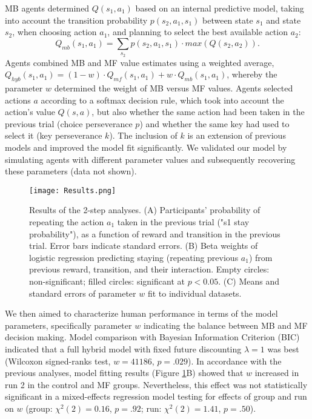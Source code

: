 \documentclass[11pt]{article} %
\begin{document}
MB agents determined $Q(s_{1}, a_{1})$ based on an internal predictive model, taking into account the transition probability $p(s_{2}, a_{1}, s_{1})$ between state $s_{1}$ and state $s_{2}$, when choosing action $a_{1}$, and planning to select the best available action $a_{2}$:
%
\begin{equation}
Q_{mb}(s_{1}, a_{1}) = \sum_{s_{2}} p(s_{2}, a_{1}, s_{1}) \cdot max(Q(s_{2}, a_{2})).
\end{equation}
%
Agents combined MB and MF value estimates using a weighted average, $Q_{hyb}(s_{1}, a_{1}) = (1 - w) \cdot Q_{mf}(s_{1}, a_{1}) + w \cdot Q_{mb}(s_{1}, a_{1})$, whereby the parameter $w$ determined the weight of MB versus MF values. Agents selected actions $a$ according to a softmax decision rule, which took into account the action's value $Q(s, a)$, but also whether the same action had been taken in the previous trial (choice perseverance $p$) and whether the same key had used to select it (key perseverance $k$). The inclusion of $k$ is an extension of previous models and improved the model fit significantly. We validated our model by simulating agents with different parameter values and subsequently recovering these parameters (data not shown).
%
\begin{figure}
	\texttt{[image: Results.png]}
	\caption{Results of the 2-step analyses. (A) Participants' probability of repeating the action $a_{1}$ taken in the previous trial ("s1 stay probability"), as a function of reward and transition in the previous trial. Error bars indicate standard errors. (B) Beta weights of logistic regression predicting staying (repeating previous $a_{1}$) from previous reward, transition, and their interaction. Empty circles: non-significant; filled circles: significant at $p < 0.05$. (C) Means and standard errors of parameter $w$ fit to individual datasets.}
	\label{Results}
\end{figure}
%
We then aimed to characterize human performance in terms of the model parameters, specifically parameter $w$ indicating the balance between MB and MF decision making. Model comparison with Bayesian Information Criterion (BIC) indicated that a full hybrid model with fixed future discounting $\lambda=1$ was best (Wilcoxon signed-ranks test, $w = 41186$, $p = .029$). In accordance with the previous analyses, model fitting results (Figure \ref{Results}B) showed that $w$ increased in run 2 in the control and MF groups. Nevertheless, this effect was not statistically significant in a mixed-effects regression model testing for effects of group and run on $w$ (group: $\chi^{2}(2)=0.16$, $p = .92$; run: $\chi^{2}(2)=1.41$, $p = .50$).
\end{document}
